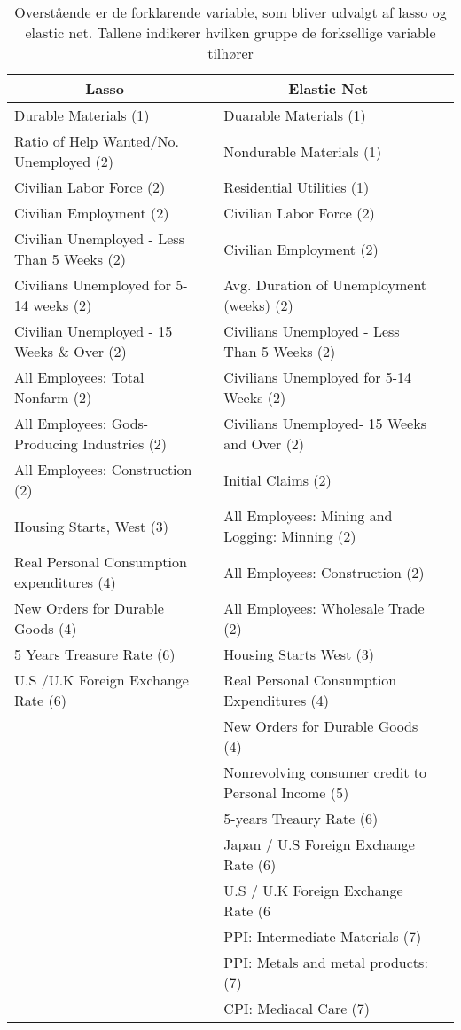  \begin{table}
\small
\center
\begin{tabular}{lc  | lc}
\toprule
\multicolumn{1}{c}{Lasso} &&   \multicolumn{1}{c}{Elastic Net} \\ \midrule
Durable Materials (1)  && Duarable Materials (1)  \\
Ratio of Help Wanted/No. Unemployed (2) &&  Nondurable Materials (1)\\
Civilian Labor Force (2)  & & Residential Utilities (1) \\
Civilian Employment  (2) &&  Civilian Labor Force (2)\\
Civilian Unemployed - Less Than 5 Weeks (2)  && Civilian Employment (2) & \\
Civilians Unemployed for 5-14 weeks (2) & & Avg. Duration of Unemployment (weeks) (2)\\
Civilian Unemployed - 15 Weeks \& Over (2) && Civilians Unemployed - Less Than 5 Weeks (2)  \\
All Employees: Total Nonfarm (2) && Civilians Unemployed for 5-14 Weeks (2) &\\
All Employees: Gods-Producing Industries (2) && Civilians Unemployed- 15 Weeks and Over (2) \\
All Employees: Construction (2) && Initial Claims (2) \\
Housing Starts, West (3) & & All Employees: Mining and Logging: Minning (2)\\
Real Personal Consumption expenditures (4) && All Employees: Construction (2) \\
New Orders for Durable Goods (4) &  & All Employees:  Wholesale Trade (2) \\
5 Years Treasure Rate (6) && Housing Starts West (3) \\
U.S /U.K Foreign Exchange Rate  (6)  & & Real Personal Consumption Expenditures (4)\\ 
&&New Orders for Durable Goods (4) \\
&& Nonrevolving consumer credit to Personal Income (5) \\
&& 5-years Treaury Rate (6)  \\
&& Japan / U.S Foreign Exchange Rate (6) \\
&&U.S / U.K Foreign Exchange Rate (6 \\
&& PPI: Intermediate Materials (7) \\
&&PPI: Metals and metal products:(7) \\
&&CPI: Mediacal Care (7) \\ \bottomrule 
\end{tabular}
\caption{Overstående er de forklarende variable, som bliver udvalgt af lasso og elastic net. Tallene indikerer hvilken gruppe de forksellige variable tilhører} \label{tab: lasso_ud}
\end{table}
